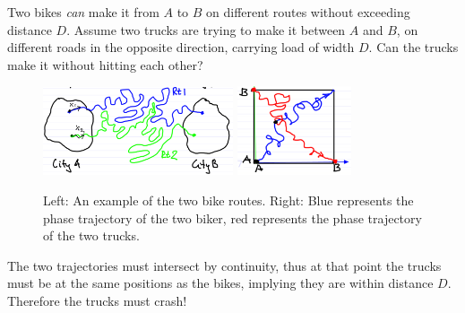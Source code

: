 \begin{ex}
	Two bikes \emph{can} make it from $A$ to $B$ on different routes without exceeding distance $D$. Assume two trucks are trying to make it between $A$ and $B$, on different roads in the opposite direction, carrying load of width $D$. Can the trucks make it without hitting each other?	
	\begin{figure}[h]
		\centering
		\includegraphics[width=0.5\textwidth]{figures/intro/7routes.png}
		\hspace{0.05\textwidth}
		\includegraphics[width=0.3\textwidth]{figures/intro/8truck_geometry.png}
		\caption{Left: An example of the two bike routes. Right: Blue represents the phase trajectory of the two biker, red represents the phase trajectory of the two trucks.}
	\end{figure}

The two trajectories must intersect by continuity, thus at that point the trucks must be at the same positions as the bikes, implying they are within distance $D$. Therefore the trucks must crash!	
\end{ex}


